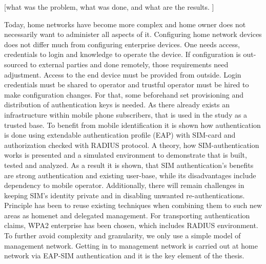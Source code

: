 \documentclass[12pt,a4paper,english]{tutthesis}
\begin{document}
[what was the problem, what was done, and what are the results. ]

Today, home networks have become more complex and home owner 
does not necessarily want to administer all aspects of it.
Configuring home network devices does not differ much from configuring enterprise devices. One needs access, credentials to login and knowledge to operate the device. If configuration is out-sourced to external parties and 
done remotely, those requirements need adjustment.
Access to the end device must be provided from outside. Login credentials must be shared to operator and trustful operator must be hired to make configuration changes.
For that,  some beforehand set provisioning and distribution of authentication keys is needed.
As there already exists an infrastructure within mobile phone subscribers, that is used in the study as a trusted base.
To benefit from mobile identification it is shown how
authentication is done using extendable authentication profile (EAP) with SIM-card
and authorization checked with RADIUS protocol.
A theory, how SIM-authentication works is presented and a simulated environment
to demonstrate that is built, tested and analyzed.
As a result it is shown, that SIM authentication's benefits are strong
authentication and existing user-base, while its disadvantages include
dependency to mobile operator. Additionally, there will remain challenges in keeping SIM's identity private and in disabling unwanted re-authentications. %
Principle has been to reuse existing techniques when combining them to such new areas as homenet and delegated management.
 For transporting authentication claims, WPA2 enterprise has been chosen, which includes RADIUS environment.
To further avoid complexity and granularity, we
only use a simple model of management network. Getting in to management network is carried out at home network via EAP-SIM authentication and it is the key element of the thesis.



\end{document}
